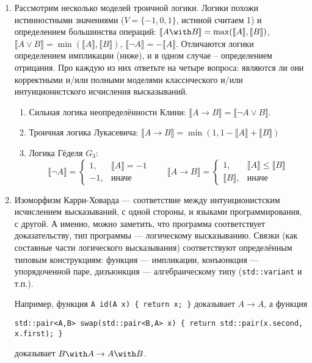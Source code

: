 \documentclass[10pt,a4paper,oneside]{article}
\begin{document}
\begin{enumerate}
\item Рассмотрим несколько моделей троичной логики. Логики похожи истинностными значениями ($V = \{ -1, 0, 1 \}$, истиной считаем 1)
и определением большинства операций:
$\llbracket A \with B\rrbracket = \max(\llbracket A \rrbracket, \llbracket B \rrbracket)$,
$\llbracket A \vee B\rrbracket = \min(\llbracket A \rrbracket, \llbracket B \rrbracket)$,
$\llbracket \neg A\rrbracket = -\llbracket A \rrbracket$. Отличаются логики определением импликации (ниже), и в одном случае -- определением отрицания.
Про каждую из них ответьте на четыре вопроса:
являются ли они корректными и/или полными моделями классического и/или интуиционистского исчисления высказываний.

\begin{enumerate}
\item Сильная логика неопределённости Клини: $\llbracket A \rightarrow B \rrbracket = \llbracket \neg A \vee B \rrbracket$.
\item Троичная логика Лукасевича: $\llbracket A \rightarrow B \rrbracket = \min(1,1 -\llbracket A \rrbracket + \llbracket B \rrbracket)$
\item Логика Гёделя $G_3$: $$\llbracket \neg A \rrbracket = \left\{\begin{array}{ll}1,& \llbracket A \rrbracket = -1\\-1,&\text{иначе} \end{array}\right.
  \quad\quad \llbracket A \rightarrow B \rrbracket = \left\{\begin{array}{ll}1,& \llbracket A \rrbracket \le \llbracket B \rrbracket \\\llbracket B \rrbracket,&\text{иначе}\end{array}\right.$$
\end{enumerate}

\item Изоморфизм Карри-Ховарда --- соответствие между интуиционистским исчислением высказываний, с одной стороны, и 
языками программирования, с другой. А именно, можно заметить, что программа соответствует доказательству, тип программы --- 
логическому высказыванию. Связки (как составные части логического высказывания) соответствуют определённым типовым конструкциям:
функция --- импликации, конъюнкция --- упорядоченной паре, дизъюнкция --- алгебраическому типу (\verb!std::variant! и т.п.).

Например, функция \verb!A id(A x) { return x; }! доказывает $A \rightarrow A$, а функция 
\begin{verbatim}
std::pair<A,B> swap(std::pair<B,A> x) { return std::pair(x.second, x.first); }
\end{verbatim}
доказывает $B\with A \rightarrow A \with B$.


\end{enumerate}
\end{document}

